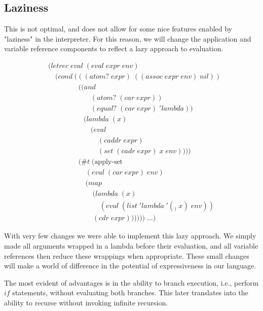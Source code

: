 \subsection{Laziness}
This is not optimal, and does not allow for some nice features enabled by 
"laziness" in the interpreter. For this reason, we will change the 
application and variable reference components to reflect a lazy approach to 
evaluation.

\begin{figure}[htp]
\caption{}\label{fig:lazinessEval}
\begin{align*}
& (letrec \; eval \; (eval \; expr \; env)
\\& \quad (cond \; (((atom? \; expr) \; ((assoc \; expr \; env) \; nil))
\\& \qquad \qquad \; ((and \; 
\\& \qquad \qquad \qquad (atom? \; (car \; expr)) \; 
\\& \qquad \qquad \qquad (equal? \; (car \; expr) \; 'lambda)) \; 
\\& \qquad \qquad \quad (lambda \; (x) \; 
\\& \qquad \qquad \qquad (eval \; 
\\& \qquad \qquad \qquad \quad (caddr \; expr) \; 
\\& \qquad \qquad \qquad \quad (set \; (cadr \; expr) \; x \; env))))
\\& \qquad \qquad \; (\#t \; (\text{apply-set} \; 
\\& \qquad \qquad \quad \; (eval \; (car \; expr) \; env) \; 
\\& \qquad \qquad \quad \; (map \; 
\\& \qquad \qquad \qquad \; (lambda \; (x) \; 
\\& \qquad \qquad \qquad \quad \; (eval \; (list \; 'lambda \; '(_) \; x) \; env)) \; 
\\& \qquad \qquad \qquad \; (cdr \; expr)))))) \; \dots)
\end{align*}
\end{figure}

With very few changes we were able to implement this lazy approach. We simply 
made all arguments wrapped in a lambda before their evaluation, and all 
variable references then reduce these wrappings when appropriate. These small 
changes will make a world of difference in the potential of expressiveness in 
our language.

The most evident of advantages is in the ability to branch execution, i.e., 
perform $if$ statements, without evaluating both branches. This later 
translates into the ability to recurse without invoking infinite recursion.

